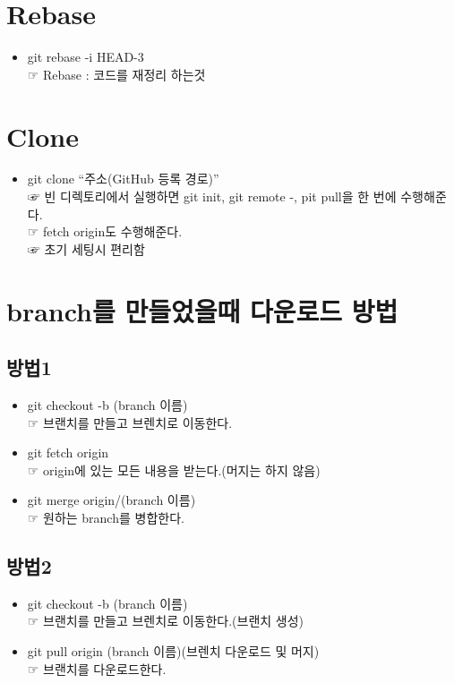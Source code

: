 \documentclass[12pt,a4paper]{oblivoir}
\begin{document}
\section[Rebase]{Rebase}
\begin{itemize}
\item git rebase -i HEAD-3 \\  ☞ Rebase : 코드를 재정리 하는것
\end{itemize}

\section[Clone]{Clone}
\begin{itemize}
\item git clone ``주소(GitHub 등록 경로)'' \\  ☞ 빈 디렉토리에서 실행하면 git init, git remote -, pit pull을 한 번에 수행해준다. \\  ☞ fetch origin도 수행해준다. \\  ☞ 초기 세팅시 편리함
\end{itemize}

\section[branch를 만들었을때 다운로드 방법]{branch를 만들었을때 다운로드 방법}
\subsection{방법1}
\begin{itemize}
\item git checkout -b (branch 이름) \\  ☞ 브랜치를 만들고 브렌치로 이동한다.
\item git fetch origin \\  ☞ origin에 있는 모든 내용을 받는다.(머지는 하지 않음)
\item git merge origin/(branch 이름) \\  ☞ 원하는 branch를 병합한다.
\end{itemize}
\subsection{방법2}
\begin{itemize}
  \item git checkout -b (branch 이름) \\  ☞ 브랜치를 만들고 브렌치로 이동한다.(브랜치 생성)
\item git pull origin (branch 이름)(브렌치 다운로드 및 머지) \\  ☞ 브랜치를 다운로드한다.
\end{itemize}
\end{document}
